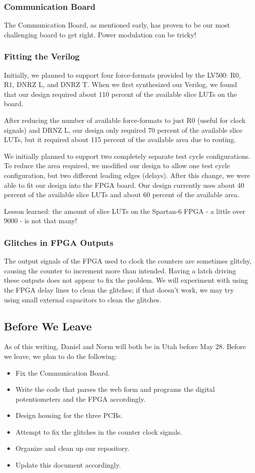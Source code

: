 \subsubsection{Communication Board}
The Communication Board, as mentioned early, has proven to be our most challenging board to get right. Power modulation can be tricky!

\subsubsection{Fitting the Verilog}
Initially, we planned to support four force-formats provided by the LV500: R0, R1, DNRZ L, and DNRZ T. When we first synthesized our Verilog, we found that our design required about 110 percent of the available slice LUTs on the board. 

After reducing the number of available force-formats to just R0 (useful for clock signals) and DRNZ L, our design only required 70 percent of the available slice LUTs, but it required about 115 percent of the available area due to routing.

We initially planned to support two completely separate test cycle configurations. To reduce the area required, we modified our design to allow one test cycle configuration, but two different leading edges (delays). After this change, we were able to fit our design into the FPGA board. Our design currently uses about 40 percent of the available slice LUTs and about 60 percent of the available area. 

Lesson learned: the amount of slice LUTs on the Spartan-6 FPGA - a little over 9000 - is not that many!

\subsubsection{Glitches in FPGA Outputs}
The output signals of the FPGA used to clock the counters are sometimes glitchy, causing the counter to increment more than intended. Having a latch driving these outputs does not appear to fix the problem. We will experiment with using the FPGA delay lines to clean the glitches; if that doesn't work, we may try using small external capacitors to clean the glitches.

\subsection{Before We Leave}
As of this writing, Daniel and Norm will both be in Utah before May 28. Before we leave, we plan to do the following:
\begin{itemize}
\item Fix the Communication Board.
\item Write the code that parses the web form and programs the digital potentiometers and the FPGA accordingly.
\item Design housing for the three PCBs.
\item Attempt to fix the glitches in the counter clock signals.
\item Organize and clean up our repository.
\item Update this document accordingly.
\end{itemize}

\newpage